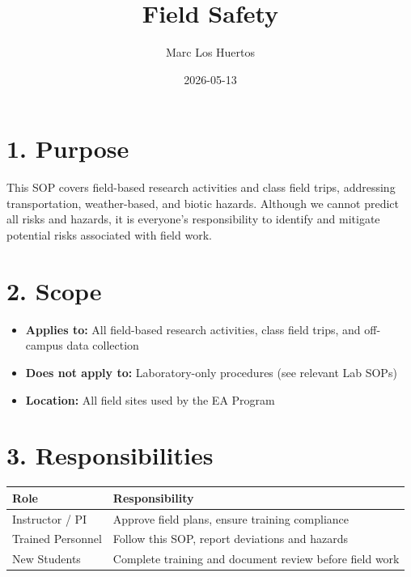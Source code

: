\documentclass[
  11pt,
  letterpaper,
]{article}
\title{Field Safety}
\author{Marc Los Huertos}
\date{2026-05-13}
\providecommand{\tightlist}{%
  \setlength{\itemsep}{0pt}\setlength{\parskip}{0pt}}
\renewcommand*\contentsname{Table of contents}
\newcommand\contentsname{Table of contents}
\begin{document}
\maketitle

\renewcommand*\contentsname{Table of contents}
{
\hypersetup{linkcolor=}
\setcounter{tocdepth}{3}
\tableofcontents
}

\section{1. Purpose}\label{purpose}

This SOP covers field-based research activities and class field trips,
addressing transportation, weather-based, and biotic hazards. Although
we cannot predict all risks and hazards, it is everyone's responsibility
to identify and mitigate potential risks associated with field work.

\section{2. Scope}\label{scope}

\begin{itemize}
\tightlist
\item
  \textbf{Applies to:} All field-based research activities, class field
  trips, and off-campus data collection
\item
  \textbf{Does not apply to:} Laboratory-only procedures (see relevant
  Lab SOPs)
\item
  \textbf{Location:} All field sites used by the EA Program
\end{itemize}

\section{3. Responsibilities}\label{responsibilities}

\begin{longtable}[]{@{}
  >{\raggedright\arraybackslash}p{}
  >{\raggedright\arraybackslash}p{}@{}}
\toprule\noalign{}
\begin{minipage}[b]{\linewidth}\raggedright
Role
\end{minipage} & \begin{minipage}[b]{\linewidth}\raggedright
Responsibility
\end{minipage} \\
\midrule\noalign{}
\endhead
\bottomrule\noalign{}
\endlastfoot
Instructor / PI & Approve field plans, ensure training compliance \\
Trained Personnel & Follow this SOP, report deviations and hazards \\
New Students & Complete training and document review before field
work \\
\end{longtable}
\end{document}

